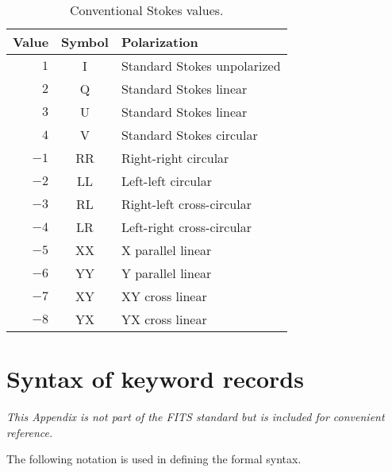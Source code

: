 \documentclass[onecolumn]{aa}
\begin{document}
\begin{table}
\centering
\caption{Conventional Stokes values.}
\label{ta:stokes}
\begin{tabular}{rcl} 
\hline \hline
Value &  Symbol &   Polarization \\
\hline
   $1$  & I      & Standard Stokes unpolarized \\
   $2$  & Q      & Standard Stokes linear \\
   $3$  & U      & Standard Stokes linear \\
   $4$  & V      & Standard Stokes circular \\
  $-1$  & RR     & Right-right circular \\
  $-2$  & LL     & Left-left circular \\
  $-3$  & RL     & Right-left cross-circular \\
  $-4$  & LR     & Left-right cross-circular \\
  $-5$  & XX     & X parallel linear\\
  $-6$  & YY     & Y parallel linear\\
  $-7$  & XY     & XY cross linear\\
  $-8$  & YX     & YX cross linear\\
\hline
\end{tabular}
\end{table}

\ifiaufwgstyle
\clearpage
\fi

\appendix
  \section{Syntax of keyword records}
  \label{s:FormSyn}

{\em This Appendix is not part of the {\em FITS\/} standard but is 
included for convenient reference.}

The following notation is used in defining the formal syntax.
\end{document}
